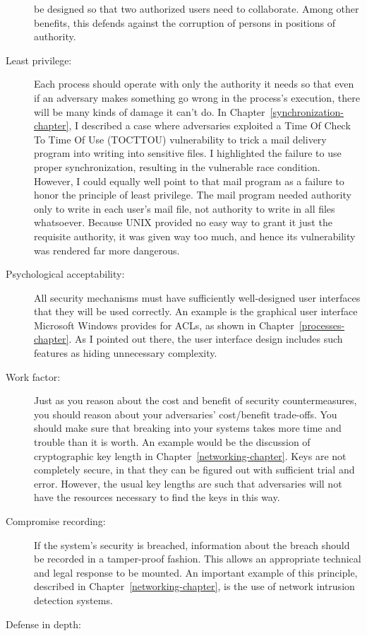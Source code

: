 \begin{description}
be designed so that two authorized users need to collaborate.  Among
other benefits, this defends against the corruption of persons in
positions of authority.
\item[Least privilege:]
Each process should operate with only the authority
it needs so that even if an adversary makes something go wrong in the
process's execution, there will be many kinds of damage it can't do.
In Chapter~\ref{synchronization-chapter}, I described a case where
adversaries exploited a Time Of Check To Time Of Use (TOCTTOU) vulnerability to trick a mail delivery
program into writing into sensitive files.  I highlighted the failure
to use proper synchronization, resulting in the vulnerable race
condition.  However, I could equally well point to that mail program
as a failure to honor the principle of least privilege.  The mail
program needed authority only to write in each user's mail file, not
authority to write in all files whatsoever.  Because UNIX provided no
easy way to grant it just the requisite authority, it was given way
too much, and hence its vulnerability was rendered far more dangerous.
\item[Psychological acceptability:]
All security mechanisms must have
sufficiently well-designed user interfaces that they will be used
correctly.  An example is the graphical user interface Microsoft
Windows provides for ACLs, as shown in
Chapter~\ref{processes-chapter}.  As I pointed out there, the user
interface design includes such features as hiding unnecessary
complexity.
\item[Work factor:]
Just as you reason about the cost and benefit of security
countermeasures, you should reason about your adversaries' cost/benefit
trade-offs.  You should make sure that breaking into your systems takes
more time and trouble than it is worth.  An example would be the
discussion of cryptographic key length in
Chapter~\ref{networking-chapter}.  Keys are not completely secure, in
that they can be figured out with sufficient trial and error.
However, the usual key lengths are such that adversaries will not have
the resources necessary to find the keys in this way.
\item[Compromise recording:]
If the system's security is breached,
information about the breach should be recorded in a tamper-proof
fashion.  This allows an appropriate technical and legal response to
be mounted.  An important example of this principle, described in
Chapter~\ref{networking-chapter}, is the use of network intrusion
detection systems.
\item[Defense in depth:]

\end{description}
